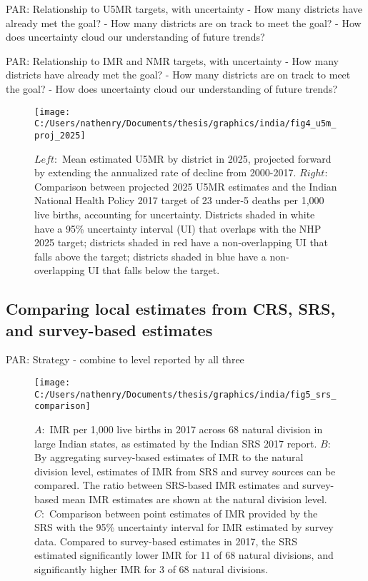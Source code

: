 \documentclass[
]{article}
\begin{document}
PAR: Relationship to U5MR targets, with uncertainty
- How many districts have already met the goal?
- How many districts are on track to meet the goal?
- How does uncertainty cloud our understanding of future trends?

PAR: Relationship to IMR and NMR targets, with uncertainty
- How many districts have already met the goal?
- How many districts are on track to meet the goal?
- How does uncertainty cloud our understanding of future trends?

\begin{figure}[!hbt]

{\centering \texttt{[image: C:/Users/nathenry/Documents/thesis/graphics/india/fig4\_u5m\_proj\_2025]} 

}

\caption{\(Left:\) Mean estimated U5MR by district in 2025, projected forward by extending the annualized rate of decline from 2000-2017. \(Right:\) Comparison between projected 2025 U5MR estimates and the Indian National Health Policy 2017 target of 23 under-5 deaths per 1,000 live births, accounting for uncertainty. Districts shaded in white have a 95\% uncertainty interval (UI) that overlaps with the NHP 2025 target; districts shaded in red have a non-overlapping UI that falls above the target; districts shaded in blue have a non-overlapping UI that falls below the target.}\label{fig:projections}
\end{figure}

\hypertarget{comparing-local-estimates-from-crs-srs-and-survey-based-estimates}{%
\subsection{Comparing local estimates from CRS, SRS, and survey-based estimates}\label{comparing-local-estimates-from-crs-srs-and-survey-based-estimates}}

PAR: Strategy - combine to level reported by all three

\begin{figure}[!hbt]

{\centering \texttt{[image: C:/Users/nathenry/Documents/thesis/graphics/india/fig5\_srs\_comparison]} 

}

\caption{\(A:\) IMR per 1,000 live births in 2017 across 68 natural division in large Indian states, as estimated by the Indian SRS 2017 report. \(B:\) By aggregating survey-based estimates of IMR to the natural division level, estimates of IMR from SRS and survey sources can be compared. The ratio between SRS-based IMR estimates and survey-based mean IMR estimates are shown at the natural division level. \(C:\) Comparison between point estimates of IMR provided by the SRS with the 95\% uncertainty interval for IMR estimated by survey data. Compared to survey-based estimates in 2017, the SRS estimated significantly lower IMR for 11 of 68 natural divisions, and significantly higher IMR for 3 of 68 natural divisions.}\label{fig:srs-comparison}
\end{figure}
\end{document}
